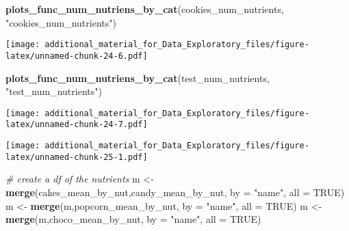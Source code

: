 \documentclass[
]{article}
\newenvironment{Shaded}{\begin{snugshade}}{\end{snugshade}}
\newcommand{\AttributeTok}[1]{\textcolor[rgb]{0.13,0.29,0.53}{#1}}
\newcommand{\CommentTok}[1]{\textcolor[rgb]{0.56,0.35,0.01}{\textit{#1}}}
\newcommand{\ConstantTok}[1]{\textcolor[rgb]{0.56,0.35,0.01}{#1}}
\newcommand{\FunctionTok}[1]{\textcolor[rgb]{0.13,0.29,0.53}{\textbf{#1}}}
\newcommand{\NormalTok}[1]{#1}
\newcommand{\OtherTok}[1]{\textcolor[rgb]{0.56,0.35,0.01}{#1}}
\newcommand{\SpecialCharTok}[1]{\textcolor[rgb]{0.81,0.36,0.00}{\textbf{#1}}}
\newcommand{\StringTok}[1]{\textcolor[rgb]{0.31,0.60,0.02}{#1}}
\begin{document}
\begin{Shaded}
\begin{Highlighting}[]
\FunctionTok{plots\_func\_num\_nutriens\_by\_cat}\NormalTok{(cookies\_num\_nutrients, }\StringTok{"cookies\_num\_nutrients"}\NormalTok{)}
\end{Highlighting}
\end{Shaded}

\texttt{[image: additional\_material\_for\_Data\_Exploratory\_files/figure-latex/unnamed-chunk-24-6.pdf]}

\begin{Shaded}
\begin{Highlighting}[]
\FunctionTok{plots\_func\_num\_nutriens\_by\_cat}\NormalTok{(test\_num\_nutrients, }\StringTok{"test\_num\_nutrients"}\NormalTok{)}
\end{Highlighting}
\end{Shaded}

\texttt{[image: additional\_material\_for\_Data\_Exploratory\_files/figure-latex/unnamed-chunk-24-7.pdf]}

\begin{Shaded}
\end{Shaded}

\texttt{[image: additional\_material\_for\_Data\_Exploratory\_files/figure-latex/unnamed-chunk-25-1.pdf]}

\begin{Shaded}
\begin{Highlighting}[]
\CommentTok{\# create a df of the nutrients }
\NormalTok{m }\OtherTok{\textless{}{-}} \FunctionTok{merge}\NormalTok{(cakes\_mean\_by\_nut,candy\_mean\_by\_nut, }\AttributeTok{by =} \StringTok{"name"}\NormalTok{, }\AttributeTok{all =} \ConstantTok{TRUE}\NormalTok{)}
\NormalTok{m }\OtherTok{\textless{}{-}} \FunctionTok{merge}\NormalTok{(m,popcorn\_mean\_by\_nut, }\AttributeTok{by =} \StringTok{"name"}\NormalTok{, }\AttributeTok{all =} \ConstantTok{TRUE}\NormalTok{)}
\NormalTok{m }\OtherTok{\textless{}{-}} \FunctionTok{merge}\NormalTok{(m,choco\_mean\_by\_nut, }\AttributeTok{by =} \StringTok{"name"}\NormalTok{, }\AttributeTok{all =} \ConstantTok{TRUE}\NormalTok{)}
\end{Highlighting}
\end{Shaded}
\end{document}
